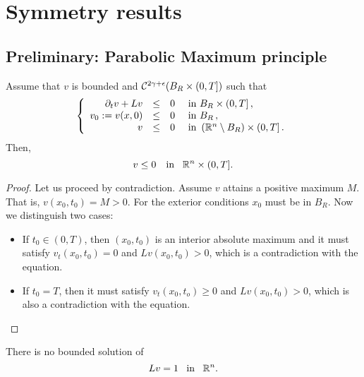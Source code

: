 \section{Symmetry results}
\label{Sec:SymmetryResults}

\subsection{Preliminary: Parabolic Maximum principle}

\begin{theorem}
\label{Thm: ParabolicmaxPrpBdd}
Assume that $v$ is bounded and $\mathcal{C}^{2\gamma+\epsilon}(B_R\times(0,T])$ such that
\begin{equation*}
\left\{\begin{array}{rcll}
\partial_t v + L v &\leq& 0 & \textrm{ in }B_R\times(0,T]\,,\\
v_0:=v(x,0) &\leq& 0 & \textrm{ in } B_R\,,\\
v &\leq& 0 & \textrm{ in } \left( \mathbb{R}^n\setminus B_R\right) \times (0,T] \,.
\end{array} \right.
\end{equation*}
Then, $$ v\leq 0 \,\,\,\, \text{ in } \,\,\, \mathbb{R}^n\times (0,T].  $$
\end{theorem}

\begin{proof}
Let us proceed by contradiction. Assume $v$ attains a positive maximum $M$. That is, $v(x_0,t_0) = M>0$. For the exterior conditions $x_0$ must be in $B_R$. Now we distinguish two cases:
\begin{itemize}
\item If $t_0\in(0,T)$, then $(x_0,t_0)$ is an interior absolute maximum and it must satisfy $v_t(x_0,t_0)=0$ and $Lv(x_0,t_0)>0$, which is a contradiction with the equation.\\
\item If $t_0 = T$, then it must satisfy $v_t(x_0,t_o)\geq 0$ and $Lv(x_0,t_0)>0$, which is also a contradiction with the equation.
\end{itemize}
\end{proof}

\begin{lemma}
\label{Lemma: NoBddSolL=1}
There is no bounded solution of $$Lv=1 \,\,\, \text{ in } \,\,\, \mathbb{R}^n.$$
\end{lemma}

